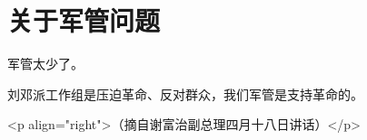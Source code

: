 \section[关于军管问题（一九六七年四月）]{关于军管问题}


军管太少了。

刘邓派工作组是压迫革命、反对群众，我们军管是支持革命的。

<p align="right">（摘自谢富治副总理四月十八日讲话）</p>


